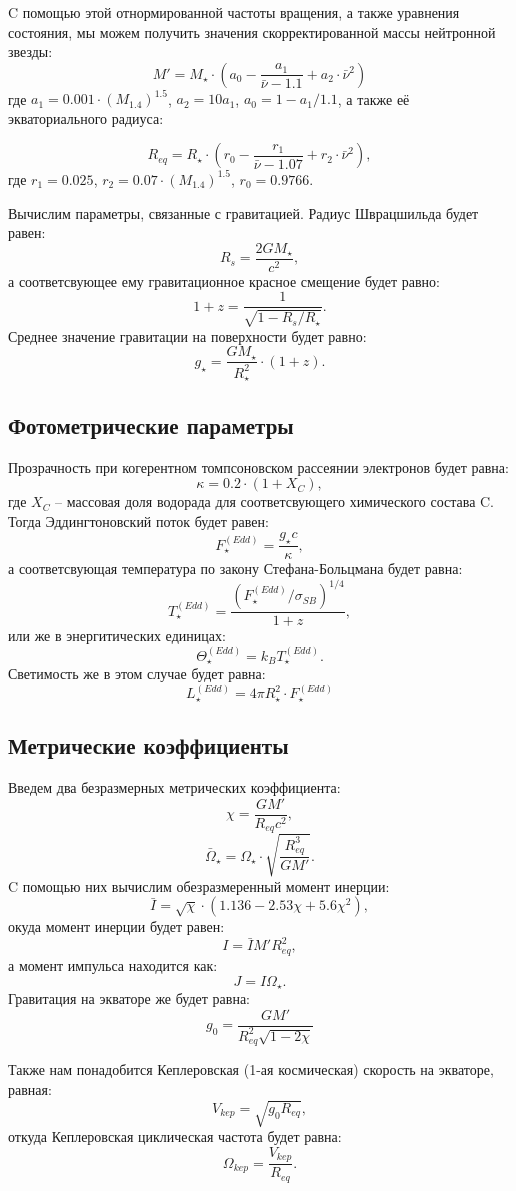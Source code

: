 C помощью этой отнормированной частоты вращения, а также уравнения состояния, мы можем получить значения скорректированной массы нейтронной звезды:
$$ M' =  M_{\star} \cdot \left(a_0 - \frac{a_1}{\bar{\nu} - 1.1} + a_2 \cdot \bar{\nu}^2 \right) $$
где $a_1 = 0.001 \cdot (M_{1.4})^{1.5} $,  $a_2 = 10 a_1$, $a_0 = 1 - a_1/1.1$, а также её экваториального радиуса:


$$ R_{eq} = R_{\star} \cdot \left(r_0 - \frac{r_1}{\bar{\nu} - 1.07} + r_2 \cdot \bar{\nu}^2 \right),$$
где $r_1 = 0.025$, $r_2 = 0.07 \cdot (M_{1.4})^{1.5}$, $r_0 = 0.9766$.

Вычислим параметры, связанные с гравитацией. Радиус Шврацшильда будет равен:
$$R_{s} = \frac{2 GM_{\star}}{c^2},$$
а соответсвующее ему гравитационное красное смещение будет равно:
$$1 + z = \frac{1}{\sqrt{1 - R_s / R_{\star}}}.$$
Среднее значение гравитации на поверхности будет равно:
$$g_{\star} = \frac{GM_{\star}}{R_{\star}^2} \cdot (1 + z).$$
\subsection{Фотометрические параметры}
Прозрачность при когерентном томпсоновском рассеянии электронов будет равна:
$$\kappa = 0.2 \cdot (1 + X_C),$$
где $X_C$ -- массовая доля водорада для соответсвующего химического состава C. 
Тогда Эддингтоновский поток будет равен:
$$F^{(Edd)}_{\star} = \frac{g_{\star}c}{\kappa},$$
а соответсвующая температура по закону Стефана-Больцмана будет равна:
$$T^{(Edd)}_{\star} = \frac{(F^{(Edd)}_{\star}/\sigma_{SB})^{1/4}}{1 + z},$$
или же в энергитических единицах:
$$\Theta^{(Edd)}_{\star} = k_B T^{(Edd)}_{\star}.$$
Светимость же в этом случае будет равна:
$$L^{(Edd)}_{\star} = 4 \pi R_{\star}^2 \cdot F^{(Edd)}_{\star}$$
\subsection{Метрические коэффициенты}
Введем два безразмерных метрических коэффициента:
$$\chi = \frac{GM'}{R_{eq}c^2}, $$
$$\bar{\Omega}_{\star} =  \Omega_{\star} \cdot \sqrt{\frac{R_{eq}^3}{G M'}}.$$
C помощью них вычислим обезразмеренный момент инерции:
$$\bar{I} = \sqrt{\chi} \cdot (1.136 - 2.53 \chi + 5.6 \chi^2),$$
окуда момент инерции будет равен:
$$I = \bar{I}  M'  R_{eq}^2,$$
а момент импульса находится как:
$$J = I\Omega_{\star}.$$
Гравитация на экваторе же будет равна:
$$g_0 = \frac{GM'}{R_{eq}^2\sqrt{1 - 2 \chi}}$$

Также нам понадобится Кеплеровская (1-ая космическая) скорость на экваторе, равная:
$$V_{kep} =  \sqrt{g_0 R_{eq}},$$
откуда Кеплеровская циклическая частота будет равна:
$$\Omega_{kep} = \frac{V_{kep}}{R_{eq}}.$$


